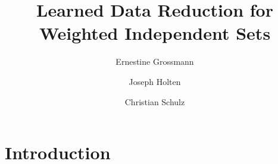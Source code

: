\documentclass[a4paper,UKenglish,cleveref, autoref, thm-restate,nolipics]{lipics-v2019}
\title{Learned Data Reduction for Weighted Independent Sets} %
\author{Ernestine Grossmann}{Heidelberg University, Heidelberg, Germany}{e.grossmann@informatik.uni-heidelberg.de}{https://orcid.org/0000-0000-0000-0000}{}
\author{Joseph Holten}{Heidelberg University, Heidelberg, Germany}{joseph.holten@stud.uni-heidelberg.de}{https://orcid.org/0000-0000-0000-0000}{}
\author{Christian Schulz}{Heidelberg University, Heidelberg, Germany}{christian.schulz@informatik.uni-heidelberg.de}{https://orcid.org/0000-0002-2823-3506}{}
\begin{document}
\maketitle

\begin{abstract}
\end{abstract}

\section{Introduction}
\label{sec:intro}
\end{document}
